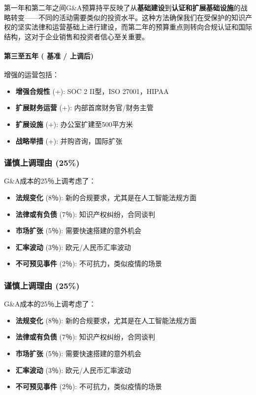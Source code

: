 \documentclass[11pt, a4paper, oneside]{article}
\begin{document}
第一年和第二年之间G\&A预算持平反映了从\textbf{基础建设}到\textbf{认证和扩展基础设施}的战略转变——不同的活动需要类似的投资水平。这种方法确保我们在受保护的知识产权的坚实法律和运营基础上进行建设，而第二年的预算重点则转向合规认证和国际结构，这对于企业销售和投资者信心至关重要。

\paragraph{第三至五年 ( 基准 /  上调后)}
增强的运营包括：
\begin{itemize}
    \item \textbf{增强合规性} (+): SOC 2 II型，ISO 27001，HIPAA
    \item \textbf{扩展财务运营} (+): 内部首席财务官/财务主管
    \item \textbf{扩展设施} (+): 办公室扩建至500平方米
    \item \textbf{战略举措} (+): 并购咨询，国际扩张
\end{itemize}

\subsubsection{谨慎上调理由 (25\%)}
G\&A成本的25％上调考虑了：
\begin{itemize}
    \item \textbf{法规变化} (8％): 新的合规要求，尤其是在人工智能法规方面
    \item \textbf{法律或有负债} (7％): 知识产权纠纷，合同谈判
    \item \textbf{市场扩张} (5％): 需要快速搭建的意外机会
    \item \textbf{汇率波动} (3％): 欧元/人民币汇率波动
    \item \textbf{不可预见事件} (2％): 不可抗力，类似疫情的场景
\end{itemize}
\subsubsection{谨慎上调理由 (25\%)}
G\&A成本的25％上调考虑了：
\begin{itemize}
    \item \textbf{法规变化} (8％): 新的合规要求，尤其是在人工智能法规方面
    \item \textbf{法律或有负债} (7％): 知识产权纠纷，合同谈判
    \item \textbf{市场扩张} (5％): 需要快速搭建的意外机会
    \item \textbf{汇率波动} (3％): 欧元/人民币汇率波动
    \item \textbf{不可预见事件} (2％): 不可抗力，类似疫情的场景
\end{itemize}
\end{document}
